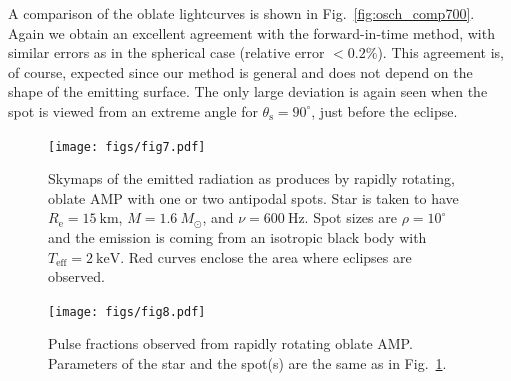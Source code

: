 \documentclass{aa}
\newcommand{\Msun}{\ensuremath{M_{\odot}}}
\begin{document}
A comparison of the oblate lightcurves is shown in Fig.~\ref{fig:osch_comp700}.
Again we obtain an excellent agreement with the forward-in-time method, with similar errors as in the spherical case (relative error $< 0.2\%$).
This agreement is, of course, expected since our method is general and does not depend on the shape of the emitting surface.
The only large deviation is again seen when the spot is viewed from an extreme angle for $\theta_{\mathrm{s}} = 90^{\circ}$, just before the eclipse.



\begin{figure}
\texttt{[image: figs/fig7.pdf]}
\caption{\label{fig:skymap}
    Skymaps of the emitted radiation as produces by rapidly rotating, oblate AMP with one or two antipodal spots.
    Star is taken to have $R_{\mathrm{e}} = 15~\mathrm{km}$, $M=1.6~\Msun$, and $\nu = 600~\mathrm{Hz}$.
    Spot sizes are $\rho = 10^{\circ}$ and the emission is coming from an isotropic black body with $T_{\mathrm{eff}} = 2~\mathrm{keV}$.
    Red curves enclose the area where eclipses are observed.
  }
\end{figure}

\begin{figure}
\texttt{[image: figs/fig8.pdf]}
\caption{\label{fig:pulsefracs}
    Pulse fractions observed from rapidly rotating oblate AMP.
    Parameters of the star and the spot(s) are the same as in Fig.~\ref{fig:skymap}.
  }
\end{figure}
\end{document}
